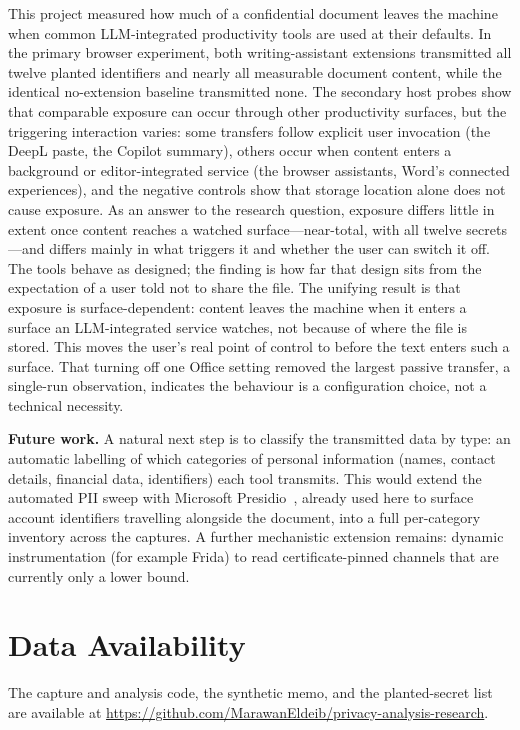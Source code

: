 \documentclass[10pt,conference,a4paper]{IEEEtran}
\begin{document}
This project measured how much of a confidential document leaves the machine when common
LLM-integrated productivity tools are used at their defaults. In the primary browser
experiment, both writing-assistant extensions transmitted all twelve planted identifiers
and nearly all measurable document content, while the identical no-extension baseline
transmitted none. The secondary host probes show that comparable exposure can occur through
other productivity surfaces, but the triggering interaction varies: some transfers follow
explicit user invocation (the DeepL paste, the Copilot summary), others occur when content
enters a background or editor-integrated service (the browser assistants, Word's connected
experiences), and the negative controls show that storage location alone does not cause
exposure. As an answer to the research question, exposure differs little in extent once
content reaches a watched surface---near-total, with all twelve secrets---and differs mainly
in what triggers it and whether the user can switch it off. The tools behave as designed; the
finding is how far that design sits from the
expectation of a user told not to share the file. The unifying result is that exposure is
surface-dependent: content leaves the machine when it enters a surface an LLM-integrated
service watches, not because of where the file is stored. This moves the user's real point
of control to before the text enters such a surface. That turning off one Office setting
removed the largest passive transfer, a single-run observation, indicates the behaviour is
a configuration choice, not a technical necessity.

\textbf{Future work.} A natural next step is to classify the transmitted data by type: an
automatic labelling of which categories of personal information (names, contact details,
financial data, identifiers) each tool transmits. This would extend the automated PII sweep
with Microsoft Presidio~\citep{microsoft2018presidio}, already used here to surface account
identifiers travelling alongside the document, into a full per-category inventory across the
captures. A further mechanistic extension remains: dynamic
instrumentation (for example Frida) to read certificate-pinned channels that are currently
only a lower bound.

\section*{Data Availability}
The capture and analysis code, the synthetic memo, and the planted-secret list are available
at \url{https://github.com/MarawanEldeib/privacy-analysis-research}.
\end{document}
